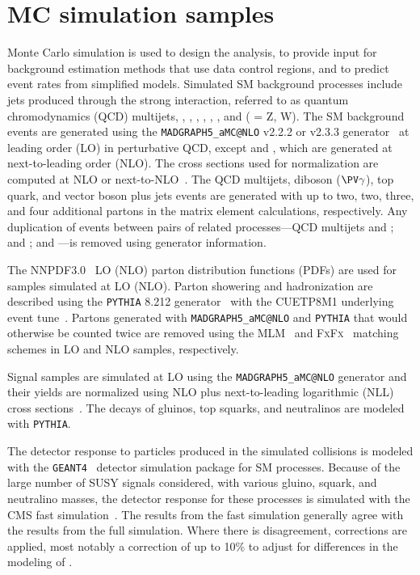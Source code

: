 \section{MC simulation samples}
\label{sec:mc-samples}
Monte Carlo simulation is used to design the analysis, to provide input for background
estimation methods that use data control regions, and to predict event rates from simplified models.
Simulated SM background processes include jets produced through the strong interaction, 
referred to as quantum chromodynamics (QCD) multijets,
\ttjets, \Wjets, \Zjets, \gjets, {\ttg}, {\tg}, and \Vgjets ({\PV} = Z, W).
The SM background events are generated using the \texttt{MADGRAPH5\_aMC@NLO} v2.2.2 or v2.3.3 
generator~\cite{Alwall:2014hca,Kalogeropoulos:2018cke,Artoisenet:2012st} at leading order (LO) in perturbative QCD,
except {\ttg} and {\tg}, which are generated at next-to-leading order (NLO).
The cross sections used for normalization are computed at NLO or next-to-NLO~\cite{Alwall:2014hca,Czakon:2011xx,Gavin:2012sy,Gavin:2010az}.
The QCD multijets, diboson ($\PV \gamma$), top quark, and vector boson plus jets events are generated with
up to two, two, three, and four additional partons in the matrix element calculations, respectively.
Any duplication of events between pairs of related processes---QCD multijets and \gjets; \ttjets and \ttg; \Wjets and \Wgjets---is removed using generator information.

The NNPDF3.0~\cite{Ball:2014uwa} LO (NLO) parton distribution functions (PDFs) are used for
samples simulated at LO (NLO).  Parton showering and hadronization are described using the \texttt{PYTHIA} 8.212
generator~\cite{Sjostrand:2014zea} with the CUETP8M1 underlying event
tune~\cite{Khachatryan:2015pea}.  Partons generated with \texttt{MADGRAPH5\_aMC@NLO}
and \texttt{PYTHIA} that would otherwise be counted twice are removed using the MLM~\cite{Alwall:2007fs}
and \textsc{FxFx}~\cite{Frederix:2012ps} matching schemes in LO and NLO samples, respectively.

Signal samples are simulated at LO using the
\texttt{MADGRAPH5\_aMC@NLO} generator and their yields are normalized using NLO plus next-to-leading logarithmic (NLL) cross sections~\cite{bib-nlo-nll-01,bib-nlo-nll-02,bib-nlo-nll-03,bib-nlo-nll-04,bib-nlo-nll-05}.
The decays of gluinos, top squarks, and neutralinos are modeled with \texttt{PYTHIA}.

The detector response to particles produced in the simulated collisions is modeled with the
\texttt{GEANT4}~\cite{Agostinelli:2002hh} detector simulation package for SM processes. Because of
the large number of SUSY signals considered, with various gluino, squark, and neutralino masses,
the detector response for these processes is simulated with the CMS fast simulation~\cite{Abdullin:2011zz,Giammanco:2014bza}.
The results from the fast simulation generally agree with the results from the full simulation. Where there is disagreement,
corrections are applied, most notably a correction of up to 10\% to adjust for differences in the modeling of \ptmiss.

